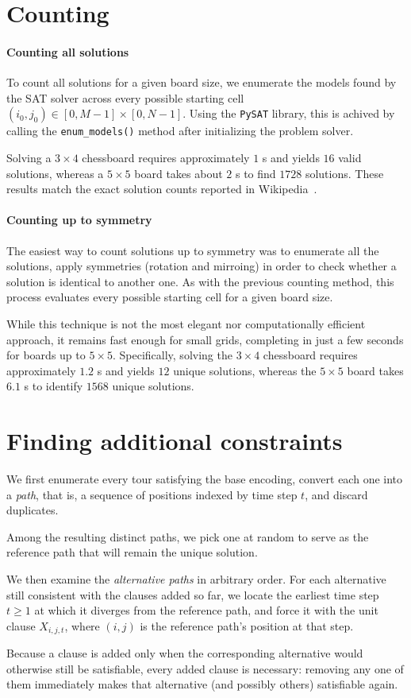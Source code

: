 \documentclass[a4paper, 11pt]{article}
\begin{document}
\section{Counting}
\paragraph{Counting all solutions}
To count all solutions for a given board size, we enumerate the models found by the SAT solver across every possible starting cell $(i_0, j_0) \in [0, M-1] \times [0, N-1]$. Using the \texttt{PySAT} library, this is achived by calling the \texttt{enum\_models()} method after initializing the problem solver.

Solving a $3 \times 4$ chessboard requires approximately $1$ s and yields $16$ valid solutions, whereas a $5 \times 5$ board takes about $2$ s to find $1728$ solutions. These results match the exact solution counts reported in Wikipedia~\cite{wikipedia_knights_tour}.

\paragraph{Counting up to symmetry}
The easiest way to count solutions up to symmetry was to enumerate all the solutions, apply symmetries (rotation and mirroing) in order to check whether a solution is identical to another one. As with the previous counting method, this process evaluates every possible starting cell for a given board size. 

While this technique is not the most elegant nor computationally efficient approach, it remains fast enough for small grids, completing in just a few seconds for boards up to $5 \times 5$. Specifically, solving the $3 \times 4$ chessboard requires approximately $1.2$ s and yields $12$ unique solutions, whereas the $5 \times 5$ board takes $6.1$ s to identify $1568$ unique solutions.

\section{Finding additional constraints}

We first enumerate every tour satisfying the base encoding, convert each one into a \textit{path}, that is, a sequence of positions indexed by time step $t$, and discard duplicates.

Among the resulting distinct paths, we pick one at random to serve as the reference path that will remain the unique solution.

We then examine the \textit{alternative paths} in arbitrary order. For each alternative still consistent with the clauses added so far, we locate the earliest time step $t \ge 1$ at which it diverges from the reference path, and force it with the unit clause $X_{i,j,t}$, where $(i,j)$ is the reference path's position at that step.

Because a clause is added only when the corresponding alternative would otherwise still be satisfiable, every added clause is necessary: removing any one of them immediately makes that alternative (and possibly others) satisfiable again.



\end{document}
